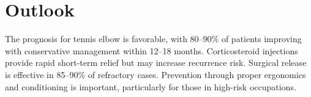 \section{Outlook}
The prognosis for tennis elbow is favorable, with 80--90\% of patients improving with conservative management within 12--18 months. Corticosteroid injections provide rapid short-term relief but may increase recurrence risk. Surgical release is effective in 85--90\% of refractory cases. Prevention through proper ergonomics and conditioning is important, particularly for those in high-risk occupations.
